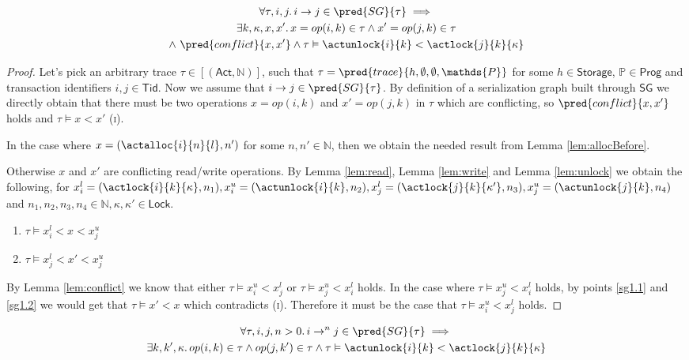 \lem \label{lem:sg1}
\begin{gather*}
\forall \tau, i, j \ldotp i \rightarrow j \in \pred{SG}{\tau} \implies \\
\exists k, \kappa, x, x' \ldotp x = op(i, k) \in \tau \land x' = op(j, k) \in \tau \\
\land\ \pred{conflict}{x, x'} \land \tau \vDash \actunlock{i}{k} < \actlock{j}{k}{\kappa}
\end{gather*}
\begin{proof}
Let's pick an arbitrary trace $\tau \in [(\mathsf{Act}, \mathds{N})]$, such that $\tau = \pred{trace}{h, \emptyset, \emptyset, \mathds{P}}$ for some $h \in \mathsf{Storage}$, $\mathds{P} \in \mathsf{Prog}$ and transaction identifiers $i, j \in \mathsf{Tid}$. Now we assume that $i \rightarrow j \in \pred{SG}{\tau}$. By definition of a serialization graph built through $\mathsf{SG}$ we directly obtain that there must be two operations $x = op(i, k)$ and $x' = op(j, k)$ in $\tau$ which are conflicting, so $\pred{conflict}{x, x'}$ holds and $\tau \vDash x < x'$ (\textsc{i}).

In the case where $x = (\actalloc{i}{n}{l}, n')$ for some $n, n' \in \mathds{N}$, then we obtain the needed result from Lemma \ref{lem:allocBefore}.

Otherwise $x$ and $x'$ are conflicting read/write operations. By Lemma \ref{lem:read}, Lemma \ref{lem:write} and Lemma \ref{lem:unlock} we obtain the following, for $x_i^l = (\actlock{i}{k}{\kappa}, n_1), x_i^u = (\actunlock{i}{k}, n_2), x_j^l = (\actlock{j}{k}{\kappa'}, n_3), x_j^u = (\actunlock{j}{k}, n_4)$ and $n_1, n_2, n_3, n_4 \in \mathds{N}, \kappa, \kappa' \in \mathsf{Lock}$.
\begin{enumerate}
	\item \label{sg1.1} $\tau \vDash x_i^l < x < x_j^u$
	\item \label{sg1.2} $\tau \vDash x_j^l < x' < x_j^u$
\end{enumerate}
By Lemma \ref{lem:conflict} we know that either $\tau \vDash x_i^u < x_j^l$ or $\tau \vDash x_j^u < x_i^l$ holds. In the case where $\tau \vDash x_j^u < x_i^l$ holds, by points \ref{sg1.1} and \ref{sg1.2} we would get that $\tau \vDash x' < x$ which contradicts (\textsc{i}). Therefore it must be the case that $\tau \vDash x_i^u < x_j^l$ holds.
\end{proof}

\lem \label{lem:sg2}
\begin{gather*}
\forall \tau, i, j, n > 0 \ldotp i \rightarrow^n j \in \pred{SG}{\tau} \implies \\
\exists k, k', \kappa \ldotp op(i, k) \in \tau \land op(j, k') \in \tau \land \tau \vDash \actunlock{i}{k} < \actlock{j}{k}{\kappa}
\end{gather*}

